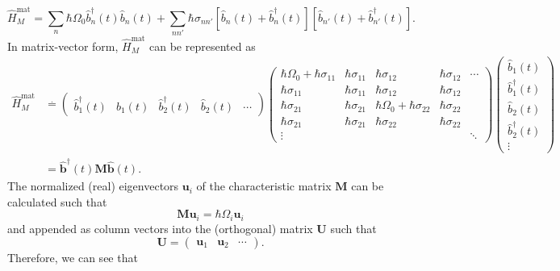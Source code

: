 \documentclass{article}
\begin{document}
\begin{equation}
\hat{H}_M^\mathrm{mat} = \sum_{n}\hbar\Omega_0\hat{b}_n^\dagger(t)\hat{b}_n(t) + \sum_{nn'}\hbar\sigma_{nn'}\left[\hat{b}_n(t) + \hat{b}_n^\dagger(t)\right]\left[\hat{b}_{n'}(t) + \hat{b}_{n'}^\dagger(t)\right].
\end{equation}
In matrix-vector form, $\hat{H}_M^\mathrm{mat}$ can be represented as
\begin{equation}
\begin{split}
\hat{H}_M^\mathrm{mat} &\overset{.}{=}
\begin{pmatrix}
\hat{b}_1^\dagger(t) & \hat{b}_1(t) & \hat{b}_2^\dagger(t) & \hat{b}_2(t) & \cdots
\end{pmatrix}
\begin{pmatrix}
\hbar\Omega_0 + \hbar\sigma_{11} & \hbar\sigma_{11} & \hbar\sigma_{12} & \hbar\sigma_{12} & \cdots\\
\hbar\sigma_{11} & \hbar\sigma_{11} & \hbar\sigma_{12} & \hbar\sigma_{12} &\\
\hbar\sigma_{21} & \hbar\sigma_{21} & \hbar\Omega_0 + \hbar\sigma_{22} & \hbar\sigma_{22} & \\
\hbar\sigma_{21} & \hbar\sigma_{21} & \hbar\sigma_{22} & \hbar\sigma_{22} & \\
\vdots & & & & \ddots
\end{pmatrix}
\begin{pmatrix}
\hat{b}_1(t)\\
\hat{b}_1^\dagger(t)\\
\hat{b}_2(t)\\
\hat{b}_2^\dagger(t)\\
\vdots
\end{pmatrix}\\
&= \hat{\mathbf{b}}^\dagger(t)\mathbf{M}\hat{\mathbf{b}}(t).
\end{split}
\end{equation}
The normalized (real) eigenvectors $\mathbf{u}_i$ of the characteristic matrix $\mathbf{M}$ can be calculated such that
\begin{equation}
\mathbf{M}\mathbf{u}_i = \hbar\Omega_i\mathbf{u}_i
\end{equation}
and appended as column vectors into the (orthogonal) matrix $\mathbf{U}$ such that
\begin{equation}
\mathbf{U} = 
\begin{pmatrix}
\mathbf{u}_1 & \mathbf{u}_2 & \cdots
\end{pmatrix}.
\end{equation}
Therefore, we can see that
\end{document}

